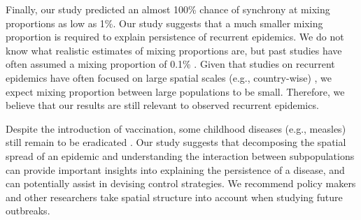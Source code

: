 \documentclass[12pt]{article}
\begin{document}
Finally, our study predicted an almost 100\% chance of synchrony at mixing proportions as low as 1\%.
Our study suggests that a much smaller mixing proportion is required to explain persistence of recurrent epidemics.
We do not know what realistic estimates of mixing proportions are, but past studies have often assumed a mixing proportion of 0.1\% \cite{earn1998persistence, keeling2002estimating}.
Given that studies on recurrent epidemics have often focused on large spatial scales (e.g., country-wise) \cite{dalziel2016persistent}, we expect mixing proportion between large populations to be small.
Therefore, we believe that our results are still relevant to observed recurrent epidemics.

Despite the introduction of vaccination, some childhood diseases (e.g., measles) still remain to be eradicated \cite{perry2015progress}.
Our study suggests that decomposing the spatial spread of an epidemic and understanding the interaction between subpopulations can provide important insights into explaining the persistence of a disease, and can potentially assist in devising control strategies. 
We recommend policy makers and other researchers take spatial structure into account when studying future outbreaks.

\newpage


\end{document}
